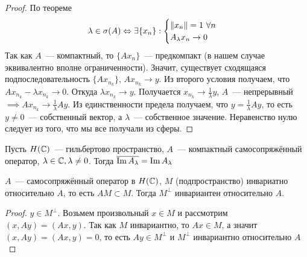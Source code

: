 \begin{proof}
    По теореме  \[
    \lambda \in \sigma(A) \Leftrightarrow \exists \{x_n\} :
    \begin{cases}
        \|x_n\| = 1\ \forall n\\
        A_{\lambda} x_n \to 0
    \end{cases}
    \]
    Так как $A$~--- компактный, то $\{Ax_n\}$~--- предкомпакт (в нашем случае эквивалентно вполне ограниченности). Значит, существует сходящаяся подпоследовательность $\{Ax_{n_k}\}$, $Ax_{n_k} \to y$.
    Из второго условия получаем, что $A x_{n_k} - \lambda x_{n_k} \to 0$. Откуда $\lambda x_{n_k} \to y$. Получается $x_{n_k} \to \frac{1}{\lambda} y$, $A$~--- непрерывный $\implies Ax_{n_k} \to \frac{1}{\lambda} Ay$. Из единственности предела получаем, что $y = \frac{1}{\lambda} A y$, то есть $y \neq 0$~--- собственный вектор, а $\lambda$~--- собственное значение. Неравенство нулю следует из того, что мы все получали из сферы.
    
\end{proof}

\begin{lemma}[2]\label{fredholm:lemma2}
    Пусть $H(\mathbb{C})$~--- гильбертово пространство, $A$~--- компактный самосопряжённый оператор, $\lambda \in \mathbb{C}, \lambda \neq 0$. Тогда $\overline{\operatorname{Im} A_\lambda} = \operatorname{Im} A_\lambda$
\end{lemma}


\begin{lemma}[3]\label{fredholm:lemma3}
    $A$~--- самосопряжённый оператор в $H(\mathbb{C})$, $M$ (подпространство) инвариатно относительно $A$, то есть $A M \subset M$. Тогда $M^\perp$ инвариантен относительно $A$.
\end{lemma}

\begin{proof}
    $y \in M^\perp$. Возьмем произвольный $x \in M$ и рассмотрим $(x, Ay) = (Ax, y)$. Так как $M$ инвариантно, то $Ax \in M$, а значит $(x, Ay)=(Ax, y)=0$, то есть $Ay \in M^\perp$ и $M^\perp$ инвариантно относительно $A$
\end{proof}

